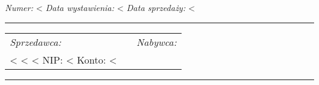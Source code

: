 \documentclass[polish]{dinbrief}
\newcommand{\lyxline}[1][1pt]{%
  \par\noindent%
  \rule[.5ex]{\linewidth}{#1}\par}
\providecommand{\tabularnewline}{\\}
\begin{document}
\begin{flushleft}
\textbf{\Large <%
\par\end{flushleft}{\Large \par}

\begin{flushleft}
\emph{Numer:} <%
\emph{Data wystawienia:} <%
\emph{Data sprzedaży:} <%
\par\end{flushleft}

\begin{flushleft}
\medskip{}

\par\end{flushleft}

\lyxline{\normalsize}


\begin{flushleft}
\begin{tabular}{|l|l|l|}
\cline{1-1} \cline{3-3} 
\emph{Sprzedawca:} &  & \emph{Nabywca:}\tabularnewline
\cline{1-1} \cline{3-3} 
<%
<%
<%
NIP: <%
Konto: <%
\cline{1-1} \cline{3-3} 
\end{tabular}
\par\end{flushleft}

\medskip{}

\lyxline{\normalsize}

\end{document}
